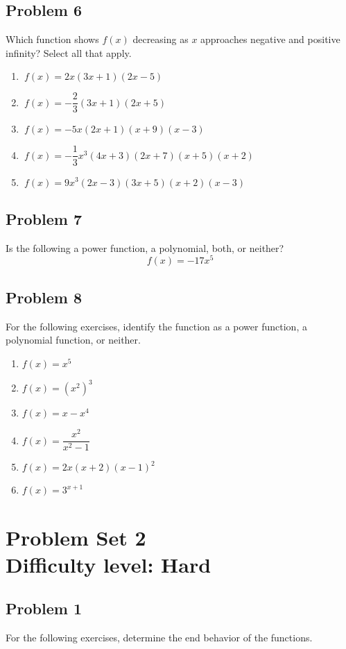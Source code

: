 \documentclass[12pt]{article}
\begin{document}
\subsection*{Problem 6}
Which function shows \(f(x)\) decreasing as \(x\) approaches negative and positive infinity? Select all that apply.

    \begin{enumerate}[label=(\alph*)]
    \item $\ f(x) = 2x(3x + 1)(2x - 5)$
    \item $\ f(x) = -\dfrac{2}{3}(3x + 1)(2x + 5)$
    \item $\ f(x) = -5x(2x + 1)(x + 9)(x - 3)$
    \item $\ f(x) = -\dfrac{1}{3}x^3(4x + 3)(2x + 7)(x + 5)(x + 2)$
    \item $\ f(x) = 9x^3(2x - 3)(3x + 5)(x + 2)(x - 3)$
\end{enumerate}

\subsection*{Problem 7}
Is the following a power function, a polynomial, both, or neither?
\[f(x)=-17x^5\]

\subsection*{Problem 8}
For the following exercises, identify the function as a power function, a polynomial function, or neither.

    \begin{enumerate}[label=(\alph*)]
    \item $f(x) = x^5$
    \item $f(x) = (x^2)^3$
    \item $f(x) = x - x^4$
    \item $f(x) = \dfrac{x^2}{x^2-1}$
    \item $f(x) = 2x \left( x + 2 \right) \left( x - 1 \right)^2$
    \item $f(x) = 3^{x+1}$
    \end{enumerate}

\section*{Problem Set 2\\Difficulty level: Hard}
\subsection*{Problem 1}
For the following exercises, determine the end behavior of the functions.
\end{document}
